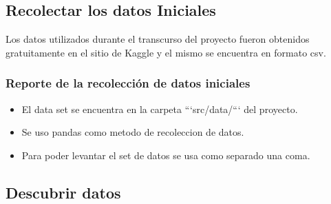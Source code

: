 \subsection{Recolectar los datos Iniciales}
    Los datos utilizados durante el transcurso del proyecto fueron obtenidos
    gratuitamente en el sitio de Kaggle y el mismo se encuentra en formato csv.
    \subsubsection{Reporte de la recolección de datos iniciales}
        \begin{itemize}
            \item El data set se encuentra en la carpeta ```src/data/``` del proyecto.
            \item Se uso pandas como metodo de recoleccion de datos.
            \item Para poder levantar el set de datos se usa como separado una coma.
        \end{itemize}
\subsection{Descubrir datos}
